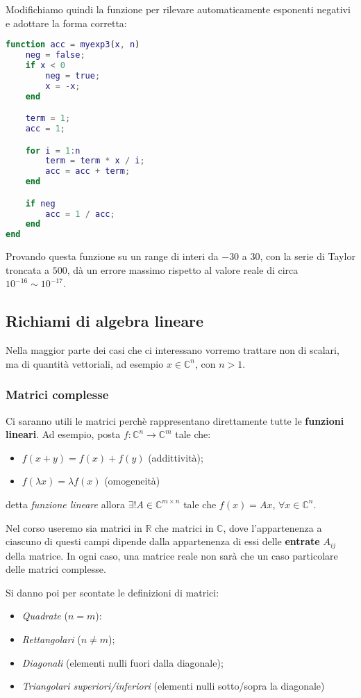 \documentclass[a4paper,11pt]{article}
\begin{document}
Modifichiamo quindi la funzione per rilevare automaticamente esponenti negativi e adottare la forma corretta:

\begin{lstlisting}[language=matlab, style=codestyle]	
function acc = myexp3(x, n)
    neg = false;
    if x < 0
        neg = true;
        x = -x;
    end

    term = 1;
    acc = 1;

    for i = 1:n
        term = term * x / i;
        acc = acc + term;
    end

    if neg
        acc = 1 / acc;
    end
end
\end{lstlisting}

Provando questa funzione su un range di interi da $-30$ a $30$, con la serie di Taylor troncata a $500$, dà un errore massimo rispetto al valore reale di circa $10^{-16} \sim 10^{-17}$.

\subsection{Richiami di algebra lineare}
Nella maggior parte dei casi che ci interessano vorremo trattare non di scalari, ma di quantità vettoriali, ad esempio $x \in \mathbb{C}^n$, con $n > 1$.

\subsubsection{Matrici complesse}
Ci saranno utili le matrici perchè rappresentano direttamente tutte le \textbf{funzioni lineari}. 
Ad esempio, posta $f: \mathbb{C}^n \rightarrow \mathbb{C}^m$ tale che:
\begin{itemize}
	\item $ f(x + y) = f(x) + f(y) $ (addittività);
	\item $f(\lambda x) = \lambda f(x)$ (omogeneità)
\end{itemize}
detta \textit{funzione lineare} allora $\exists ! A \in \mathbb{C}^{m \times n}$ tale che $f(x) = A x$,  $\forall x \in \mathbb{C}^n$.

Nel corso useremo sia matrici in $\mathbb{R}$ che matrici in $\mathbb{C}$, dove l'appartenenza a ciascuno di questi campi dipende dalla appartenenza di essi delle \textbf{entrate} $A_{ij}$ della matrice.
In ogni caso, una matrice reale non sarà che un caso particolare delle matrici complesse.

Si danno poi per scontate le definizioni di matrici:
\begin{itemize}
	\item \textit{Quadrate} ($n = m$):
	\item \textit{Rettangolari} ($n \neq m$);
	\item \textit{Diagonali} (elementi nulli fuori dalla diagonale);
	\item \textit{Triangolari superiori/inferiori} (elementi nulli sotto/sopra la diagonale) 
\end{itemize}
\end{document}
